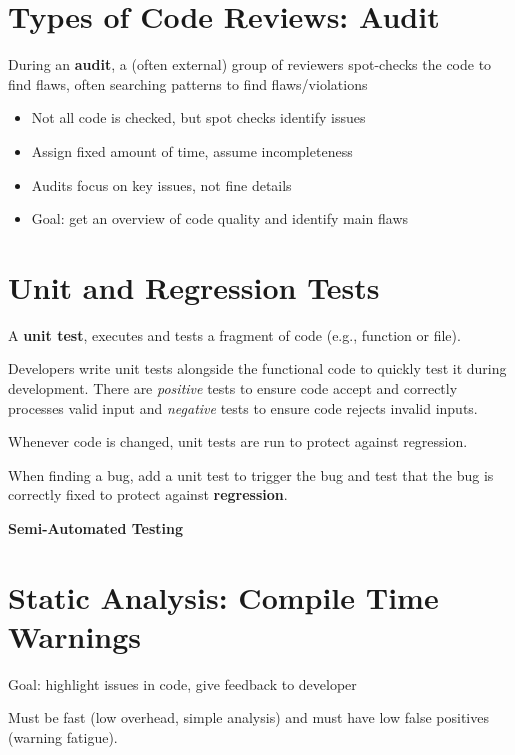\documentclass[11pt]{article}
\begin{document}
\section*{Types of Code Reviews: Audit}

During an \textbf{audit}, a (often external) group of reviewers spot-checks the code to find flaws, often searching patterns to find flaws/violations
\begin{itemize}
	\item Not all code is checked, but spot checks identify issues
	\item Assign fixed amount of time, assume incompleteness
	\item Audits focus on key issues, not fine details
	\item Goal: get an overview of code quality and identify main flaws
\end{itemize}

\section*{Unit and Regression Tests}

A \textbf{unit test}, executes and tests a fragment of code (e.g., function or file). 

Developers write unit tests alongside the functional code to quickly test it during development. There are \textit{positive} tests to ensure code accept and correctly processes valid input and \textit{negative} tests to ensure code rejects invalid inputs. 

Whenever code is changed, unit tests are run to protect against regression. 

When finding a bug, add a unit test to trigger the bug and test that the bug is correctly fixed to protect against \textbf{regression}.


\vspace{0.5cm}

\begin{center}
  {\LARGE \textbf{Semi-Automated Testing}}
\end{center}
\vspace{0.5cm}

\section*{Static Analysis: Compile Time Warnings}

Goal: highlight issues in code, give feedback to developer

Must be fast (low overhead, simple analysis) and must have low false positives (warning fatigue). 
\end{document}
